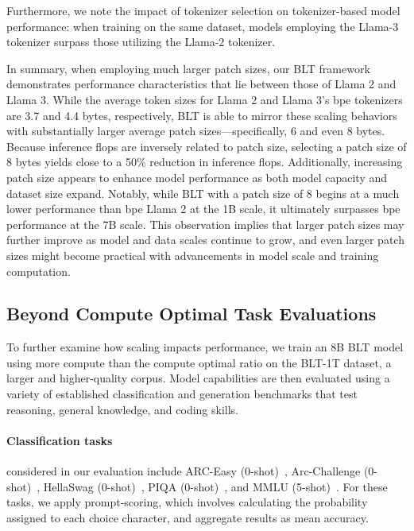 Furthermore, we note the impact of tokenizer selection on tokenizer-based model performance: when training on the same dataset, models employing the Llama-3 tokenizer surpass those utilizing the Llama-2 tokenizer.

In summary, when employing much larger patch sizes, our {\textsc BLT} framework demonstrates performance characteristics that lie between those of Llama 2 and Llama 3. While the average token sizes for Llama 2 and Llama 3’s bpe tokenizers are 3.7 and 4.4 bytes, respectively, {\textsc BLT} is able to mirror these scaling behaviors with substantially larger average patch sizes—specifically, 6 and even 8 bytes. Because inference flops are inversely related to patch size, selecting a patch size of 8 bytes yields close to a 50\% reduction in inference flops. Additionally, increasing patch size appears to enhance model performance as both model capacity and dataset size expand. Notably, while {\textsc BLT} with a patch size of 8 begins at a much lower performance than bpe Llama 2 at the 1B scale, it ultimately surpasses bpe performance at the 7B scale. This observation implies that larger patch sizes may further improve as model and data scales continue to grow, and even larger patch sizes might become practical with advancements in model scale and training computation.

\subsection{Beyond Compute Optimal Task Evaluations}
\label{section:evals}
To further examine how scaling impacts performance, we train an 8B {\textsc BLT} model using more compute than the compute optimal ratio on the {\textsc BLT}-1T dataset, a larger and higher-quality corpus. Model capabilities are then evaluated using a variety of established classification and generation benchmarks that test reasoning, general knowledge, and coding skills.

\paragraph{Classification tasks} considered in our evaluation include ARC-Easy (0-shot)~\citep{Eval_ARC}, Arc-Challenge (0-shot)~\citep{Eval_ARC}, HellaSwag (0-shot)~\citep{Eval_hellaswag}, PIQA (0-shot)~\citep{Eval_piqa}, and MMLU (5-shot)~\citep{hendrycks2020measuring}. For these tasks, we apply prompt-scoring, which involves calculating the probability assigned to each choice character, and aggregate results as mean accuracy.

